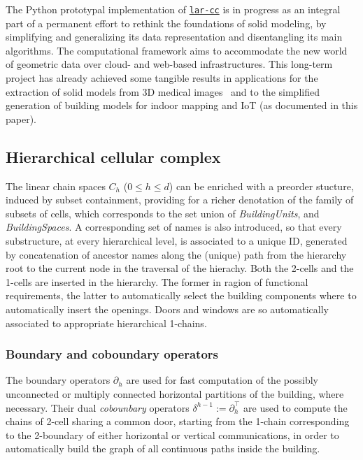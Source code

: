 \documentclass[]{egpubl}
\begin{document}
The Python prototypal implementation of \href{https://github.com/cvdlab/lar-cc}{\texttt{lar-cc}} is in progress as an integral part of a permanent effort to rethink the foundations of solid modeling, by simplifying and generalizing its data representation and disentangling its main algorithms. The computational framework aims to accommodate the new world of geometric data over cloud- and web-based infrastructures. This long-term project has already achieved some tangible results in applications for the extraction of solid models from 3D medical images~\cite{cadanda:2015} and to the simplified generation of building models for indoor mapping and IoT (as documented in this paper). 


\subsection{Hierarchical cellular complex}

The linear chain spaces $C_h$ ($0\leq h\leq d$) can be enriched with a preorder stucture, induced by subset containment, providing for a richer denotation of the family of subsets of cells, which  corresponds to the set union of \emph{BuildingUnits}, and \emph{BuildingSpaces}. A corresponding set of names is also introduced, so that every substructure, at every hierarchical level, is associated to a unique ID, generated by concatenation of ancestor names along the (unique) path from the hierarchy root to the current node in the traversal of the hierachy.  Both the 2-cells and the 1-cells are inserted in the hierarchy. The former in ragion of functional requirements, the latter to automatically select the building components where to automatically insert the openings. Doors and windows are so automatically associated to appropriate hierarchical 1-chains. 

\subsubsection*{Boundary and coboundary operators}

The boundary operators $\partial_h$ are used for fast computation of the possibly unconnected or multiply connected horizontal partitions of the building, where necessary. 
Their dual \emph{cobounbary} operators $\delta^{h-1} := \partial_h^\top$ are used to compute the chains of 2-cell sharing a common door, starting from the 1-chain corresponding to the 2-boundary of either horizontal or vertical communications, in order to automatically build the graph of all continuous paths inside the building.
\end{document}
